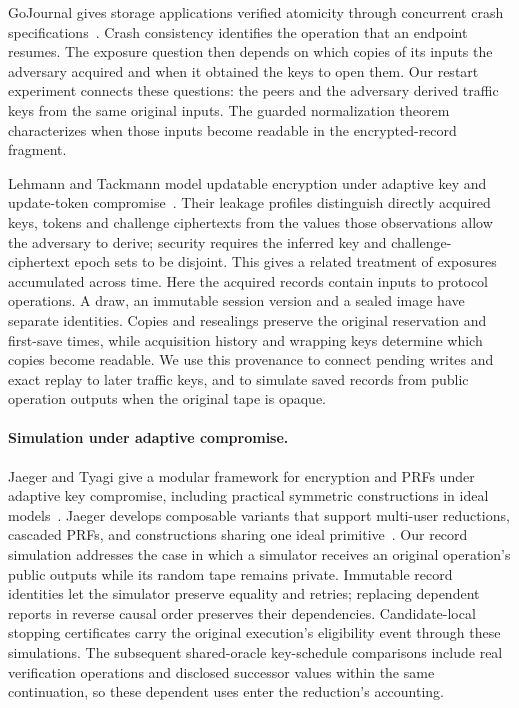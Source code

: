 \documentclass[pdflatex]{sn-jnl}
\theoremstyle{thmstyleone}
\theoremstyle{thmstylethree}
\theoremstyle{thmstyletwo}
\begin{document}
GoJournal gives storage applications verified atomicity through
concurrent crash specifications~\cite{gojournal2021}. Crash consistency
identifies the operation that an endpoint resumes. The exposure question
then depends on which copies of its inputs the adversary acquired and
when it obtained the keys to open them. Our restart experiment connects
these questions: the peers and the adversary derived traffic keys from
the same original inputs. The guarded normalization theorem characterizes
when those inputs become readable in the encrypted-record fragment.

Lehmann and Tackmann model updatable encryption under adaptive key and
update-token compromise~\cite{lehmann2018updatable}. Their leakage profiles
distinguish directly acquired keys, tokens and challenge ciphertexts from
the values those observations allow the adversary to derive; security requires
the inferred key and challenge-ciphertext epoch sets to be disjoint. This gives
a related treatment of exposures accumulated across time. Here the acquired
records contain inputs to protocol operations. A draw, an immutable session
version and a sealed image have separate identities. Copies and resealings
preserve the original reservation and first-save times, while acquisition
history and wrapping keys determine which copies become readable.
We use this provenance to connect pending writes and exact replay to later
traffic keys, and to simulate saved records from public operation outputs
when the original tape is opaque.

\paragraph{Simulation under adaptive compromise.}
Jaeger and Tyagi give a modular framework for encryption and PRFs under
adaptive key compromise, including practical symmetric constructions in
ideal models~\cite{jaeger2020adaptive}. Jaeger develops composable variants
that support multi-user reductions, cascaded PRFs, and constructions
sharing one ideal primitive~\cite{jaeger2023program}.
Our record simulation addresses the case in which a simulator
receives an original operation's public outputs while its random tape
remains private. Immutable record identities let the simulator preserve
equality and retries; replacing dependent reports in reverse causal order
preserves their dependencies. Candidate-local stopping certificates carry
the original execution's eligibility event through these simulations.
The subsequent shared-oracle key-schedule comparisons include real
verification operations and disclosed successor values within the same
continuation, so these dependent uses enter the reduction's accounting.
\end{document}
